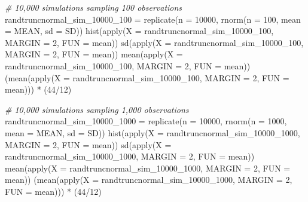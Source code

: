 \documentclass[
]{article}
\newenvironment{Shaded}{}{}
\newcommand{\AttributeTok}[1]{\textcolor[rgb]{0.49,0.56,0.16}{#1}}
\newcommand{\CommentTok}[1]{\textcolor[rgb]{0.38,0.63,0.69}{\textit{#1}}}
\newcommand{\DecValTok}[1]{\textcolor[rgb]{0.25,0.63,0.44}{#1}}
\newcommand{\FunctionTok}[1]{\textcolor[rgb]{0.02,0.16,0.49}{#1}}
\newcommand{\NormalTok}[1]{#1}
\newcommand{\OtherTok}[1]{\textcolor[rgb]{0.00,0.44,0.13}{#1}}
\newcommand{\SpecialCharTok}[1]{\textcolor[rgb]{0.25,0.44,0.63}{#1}}
\begin{document}
\begin{Shaded}
\begin{Highlighting}[numbers=left,,]
\CommentTok{\# 10,000 simulations sampling 100 observations}
\NormalTok{randtruncnormal\_sim\_10000\_100 }\OtherTok{=} \FunctionTok{replicate}\NormalTok{(}\AttributeTok{n =} \DecValTok{10000}\NormalTok{, }\FunctionTok{rnorm}\NormalTok{(}\AttributeTok{n =} \DecValTok{100}\NormalTok{, }\AttributeTok{mean =}\NormalTok{ MEAN,}
    \AttributeTok{sd =}\NormalTok{ SD))}
\FunctionTok{hist}\NormalTok{(}\FunctionTok{apply}\NormalTok{(}\AttributeTok{X =}\NormalTok{ randtruncnormal\_sim\_10000\_100, }\AttributeTok{MARGIN =} \DecValTok{2}\NormalTok{, }\AttributeTok{FUN =}\NormalTok{ mean))}
\FunctionTok{sd}\NormalTok{(}\FunctionTok{apply}\NormalTok{(}\AttributeTok{X =}\NormalTok{ randtruncnormal\_sim\_10000\_100, }\AttributeTok{MARGIN =} \DecValTok{2}\NormalTok{, }\AttributeTok{FUN =}\NormalTok{ mean))}
\FunctionTok{mean}\NormalTok{(}\FunctionTok{apply}\NormalTok{(}\AttributeTok{X =}\NormalTok{ randtruncnormal\_sim\_10000\_100, }\AttributeTok{MARGIN =} \DecValTok{2}\NormalTok{, }\AttributeTok{FUN =}\NormalTok{ mean))}
\NormalTok{(}\FunctionTok{mean}\NormalTok{(}\FunctionTok{apply}\NormalTok{(}\AttributeTok{X =}\NormalTok{ randtruncnormal\_sim\_10000\_100, }\AttributeTok{MARGIN =} \DecValTok{2}\NormalTok{, }\AttributeTok{FUN =}\NormalTok{ mean))) }\SpecialCharTok{*}\NormalTok{ (}\DecValTok{44}\SpecialCharTok{/}\DecValTok{12}\NormalTok{)}

\CommentTok{\# 10,000 simulations sampling 1,000 observations}
\NormalTok{randtruncnormal\_sim\_10000\_1000 }\OtherTok{=} \FunctionTok{replicate}\NormalTok{(}\AttributeTok{n =} \DecValTok{10000}\NormalTok{, }\FunctionTok{rnorm}\NormalTok{(}\AttributeTok{n =} \DecValTok{1000}\NormalTok{, }\AttributeTok{mean =}\NormalTok{ MEAN,}
    \AttributeTok{sd =}\NormalTok{ SD))}
\FunctionTok{hist}\NormalTok{(}\FunctionTok{apply}\NormalTok{(}\AttributeTok{X =}\NormalTok{ randtruncnormal\_sim\_10000\_1000, }\AttributeTok{MARGIN =} \DecValTok{2}\NormalTok{, }\AttributeTok{FUN =}\NormalTok{ mean))}
\FunctionTok{sd}\NormalTok{(}\FunctionTok{apply}\NormalTok{(}\AttributeTok{X =}\NormalTok{ randtruncnormal\_sim\_10000\_1000, }\AttributeTok{MARGIN =} \DecValTok{2}\NormalTok{, }\AttributeTok{FUN =}\NormalTok{ mean))}
\FunctionTok{mean}\NormalTok{(}\FunctionTok{apply}\NormalTok{(}\AttributeTok{X =}\NormalTok{ randtruncnormal\_sim\_10000\_1000, }\AttributeTok{MARGIN =} \DecValTok{2}\NormalTok{, }\AttributeTok{FUN =}\NormalTok{ mean))}
\NormalTok{(}\FunctionTok{mean}\NormalTok{(}\FunctionTok{apply}\NormalTok{(}\AttributeTok{X =}\NormalTok{ randtruncnormal\_sim\_10000\_1000, }\AttributeTok{MARGIN =} \DecValTok{2}\NormalTok{, }\AttributeTok{FUN =}\NormalTok{ mean))) }\SpecialCharTok{*}\NormalTok{ (}\DecValTok{44}\SpecialCharTok{/}\DecValTok{12}\NormalTok{)}


\end{Highlighting}
\end{Shaded}
\end{document}
